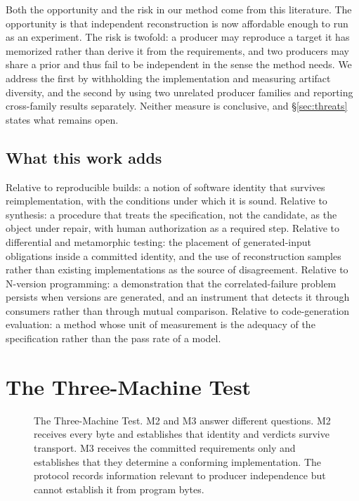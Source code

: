 \documentclass[10pt,twocolumn]{article}
\begin{document}
Both the opportunity and the risk in our method come from this
literature. The opportunity is that independent reconstruction is now
affordable enough to run as an experiment. The risk is twofold:
a producer may reproduce a target it has memorized rather than derive it
from the requirements, and two producers may share a prior and thus fail
to be independent in the sense the method needs. We address the first by
withholding the implementation and measuring artifact diversity, and the
second by using two unrelated producer families and reporting
cross-family results separately. Neither measure is conclusive, and
\S\ref{sec:threats} states what remains open.

\subsection{What this work adds}

Relative to reproducible builds: a notion of software identity that
survives reimplementation, with the conditions under which it is sound.
Relative to synthesis: a procedure that treats the specification, not the
candidate, as the object under repair, with human authorization as a
required step. Relative to differential and metamorphic testing: the
placement of generated-input obligations inside a committed identity,
and the use of reconstruction samples rather than existing
implementations as the source of disagreement. Relative to N-version
programming: a demonstration that the correlated-failure problem persists
when versions are generated, and an instrument that detects it through
consumers rather than through mutual comparison. Relative to
code-generation evaluation: a method whose unit of measurement is the
adequacy of the specification rather than the pass rate of a model.

\section{The Three-Machine Test}
\label{sec:tmt}

\begin{figure}[t]
\centering

\caption{The Three-Machine Test. M2 and M3 answer different questions.
M2 receives every byte and establishes that identity and verdicts survive
transport. M3 receives the committed requirements only and establishes
that they determine a conforming implementation. The protocol records
information relevant to producer independence but cannot establish it
from program bytes.}
\label{fig:tmt}
\end{figure}
\end{document}
